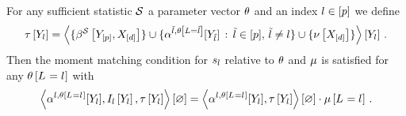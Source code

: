 \begin{lemma}
    \label{lem:mmContractionEquation}
    For any sufficient statistic $\mathcal{S}$ a parameter vector $\theta$ and an index $l\in[p]$ we define
    \begin{align*}
        \tau\left[Y_{l}\right]
        = \left\langle \{\beta^{\mathcal{S}}\left[Y_{[p]},X_{[d]}\right]\}\cup\{\alpha^{\tilde{l},\theta\left[L=\tilde{l}\right]}[Y_{\tilde{l}}] \,:\, \tilde{l} \in [p] ,\, \tilde{l}\neq l\} \cup \{\nu\left[X_{[d]}\right]\}\right\rangle \left[ Y_{l} \right] \, .
    \end{align*}
    Then the moment matching condition for $s_{l}$ relative to $\theta$ and $\mu$ is satisfied for any $\theta\left[L_{}=l_{}\right]$ with
    \begin{align*}
        \left\langle \alpha^{l,\theta\left[L_{}=l_{}\right]}[Y_{l}], I_{l}\left[Y_{l}\right], \tau\left[Y_{l}\right]\right\rangle \left[ \varnothing \right]
        = \left\langle \alpha^{l,\theta\left[L_{}=l_{}\right]}[Y_{l}], \tau\left[Y_{l}\right]\right\rangle \left[ \varnothing \right] \cdot \mu\left[L_{}=l_{}\right] \, .
    \end{align*}
\end{lemma}
